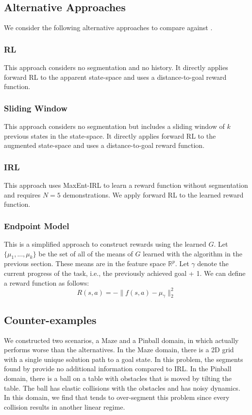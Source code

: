 \subsection{Alternative Approaches}
We consider the following alternative approaches to compare against \hirl. 

\subsubsection{RL}
This approach considers no segmentation and no history. It directly applies forward RL to the apparent state-space and uses a distance-to-goal reward function.

\subsubsection{Sliding Window}
This approach considers no segmentation but includes a sliding window of $k$ previous states in the state-space. It directly applies forward RL to the augmented state-space and uses a distance-to-goal reward function.

\subsubsection{IRL}
This approach uses MaxEnt-IRL to learn a reward function without segmentation and requires $N=5$ demonstrations. We apply forward RL to the learned reward function. 

\subsubsection{Endpoint Model}
This is a simplified approach to construct rewards using the learned $G$.
Let $\{\mu_1,...,\mu_k\}$ be the set of all of the means of $G$ learned with the algorithm in the previous section.
These means are in the feature space $\mathbb{R}^p$.
Let $\gamma$ denote the current progress of the task, i.e., the previously achieved goal  + 1. 
We can define a reward function as follows:
\[
R(s,a) = -\|f(s,a) - \mu_{\gamma}\|_2^2 
\]

\subsection{Counter-examples}
We constructed two scenarios, a Maze and a Pinball domain, in which \hirl actually performs worse than the alternatives. In the Maze domain, there is a 2D grid with a single unique solution path to a goal state.
In this problem, the segments found by \hirl provide no additional information compared to IRL.
In the Pinball domain, there is a ball on a table with obstacles that is moved by tilting the table.
The ball has elastic collisions with the obstacles and has noisy dynamics.
In this domain, we find that \hirl tends to over-segment this problem since every collision results in another linear regime. 


